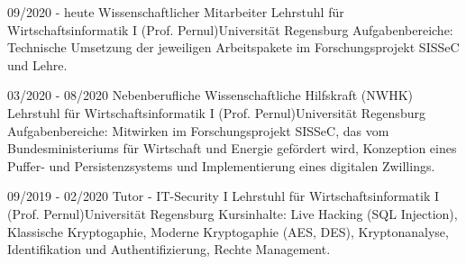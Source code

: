

\vspace{4pt}




\vspace{10pt}
\vspace{4pt}


\cvevent
{09/2020 - heute}
{Wissenschaftlicher Mitarbeiter}
{Lehrstuhl für Wirtschaftsinformatik I (Prof. Pernul)\newline Universität Regensburg}
{Aufgabenbereiche: Technische Umsetzung der jeweiligen Arbeitspakete im Forschungsprojekt SISSeC und Lehre. }
\vfill\null


\cvevent
{03/2020 - 08/2020}
{Nebenberufliche Wissenschaftliche Hilfskraft (NWHK)}
{Lehrstuhl für Wirtschaftsinformatik I (Prof. Pernul)\newline Universität Regensburg}
{Aufgabenbereiche: Mitwirken im Forschungsprojekt SISSeC, das vom Bundesministeriums für Wirtschaft und Energie gefördert wird, Konzeption eines Puffer- und Persistenzsystems und Implementierung eines digitalen Zwillings. }
\vfill\null



\cvevent
{09/2019 - 02/2020}
{Tutor - IT-Security I}
{Lehrstuhl für Wirtschaftsinformatik I (Prof. Pernul)\newline Universität Regensburg}
{Kursinhalte: Live Hacking (SQL Injection), Klassische Kryptogaphie, Moderne Kryptogaphie (AES, DES), Kryptonanalyse, Identifikation und Authentifizierung, Rechte Management.}
\vfill\null



